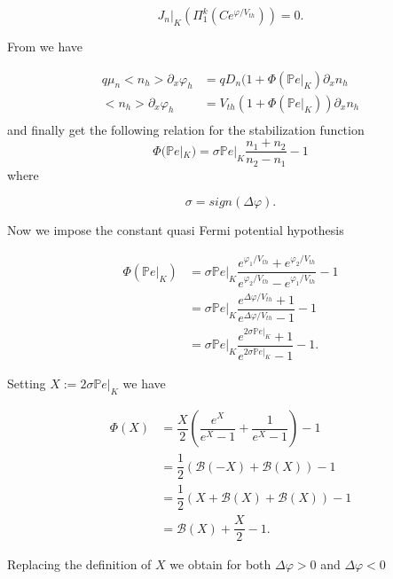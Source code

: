 \begin{equation}
J_n|_K(\Pi_1^k(Ce^{\varphi / V_{th}})) = 0 .
\end{equation}

From  we have

\begin{align*}
q\mu_n <n_h>\partial_x \varphi_h & = q D_ n(1+\Phi(\mathbb{P}e|_K)\partial_x n_h \\
<n_h>\partial_x \varphi_h & = V_{th}(1+\Phi(\mathbb{P}e|_K))\partial_x n_h \\
\end{align*}
and finally get the following relation for the stabilization function
\begin{equation}
\label{eq: SG stab func alternative}
\Phi(\mathbb{P}e|_K)  = \sigma \mathbb{P}e|_K \dfrac{n_1+n_2}{n_2-n_1}  -1
\end{equation}
where 

\begin{equation*}
\sigma = sign(\Delta \varphi).
\end{equation*}

Now we impose the constant quasi Fermi potential hypothesis

\begin{align*}
\Phi(\mathbb{P}e|_K) & = \sigma \mathbb{P}e|_K \dfrac{e^{\varphi_1/V_{th}}+e^{\varphi_2/V_{th}}}{e^{\varphi_2/V_{th}}-e^{\varphi_1/V_{th}}} -1 \\
& = \sigma \mathbb{P}e|_K \dfrac{e^{\Delta \varphi/V_{th}}+1}{e^{\Delta \varphi/V_{th}}-1} -1 \\
& = \sigma \mathbb{P}e|_K \dfrac{e^{2 \sigma \mathbb{P}e|_K}+1}{e^{2\sigma \mathbb{P}e|_K}-1} -1.
\end{align*}

Setting $X := 2 \sigma \mathbb{P}e|_K$ we have

\begin{align*}
\Phi(X) & = \dfrac{X}{2} \left( \dfrac{e^{X}}{e^{X}-1} + \dfrac{1}{e^{X}-1} \right) -1 \\
& = \dfrac{1}{2} \left( \mathcal{B}(-X) + \mathcal{B}(X) \right) -1 \\
 & = \dfrac{1}{2} \left( X + \mathcal{B}(X) + \mathcal{B}(X) \right) -1 \\
  & =  \mathcal{B}(X) +\dfrac{X}{2}  -1.
\end{align*}

Replacing the definition of $X$ we obtain for both $\Delta \varphi > 0$ and $\Delta \varphi < 0$

